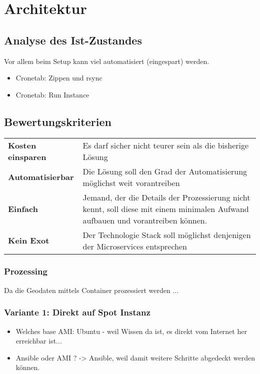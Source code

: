 \section{Architektur}

\subsection{Analyse des Ist-Zustandes}
Vor allem beim Setup kann viel automatisiert (eingespart) werden. 
\begin{itemize}
\item Cronetab: Zippen und rsync
\item Cronetab: Run Instance
\end{itemize}

\subsection{Bewertungskriterien}
\begin{tabular}{ll}
    \textbf{Kosten einsparen} & Es darf sicher nicht teurer sein als die bisherige Lösung\\
    \textbf{Automatisierbar} & Die Lösung soll den Grad der Automatisierung möglichst weit vorantreiben\\
    \textbf{Einfach} & Jemand, der die Details der Prozessierung nicht kennt, soll diese mit einem minimalen
    Aufwand aufbauen und vorantreiben können.\\
    \textbf{Kein Exot} & Der Technologie Stack soll möglichst denjenigen der Microservices entsprechen\\
\end{tabular}


\subsubsection{Prozessing}
Da die Geodaten mittels Container prozessiert werden ... 

\subsubsection{Variante 1: Direkt auf Spot Instanz}
\begin{itemize}
\item Welches base AMI: Ubuntu - weil Wissen da ist, es direkt vom Internet her erreichbar ist...
\item Ansible oder AMI ? -> Ansible, weil damit weitere Schritte abgedeckt werden können.
\end{itemize}




